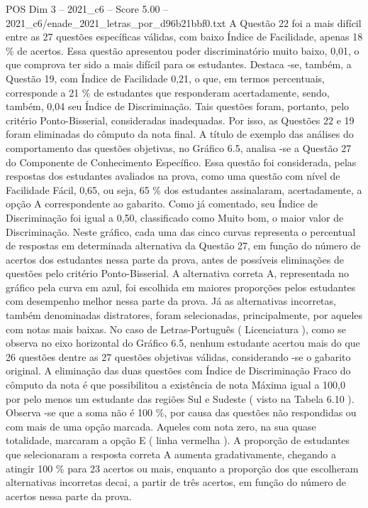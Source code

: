 \begin{textsample}{POS Dim 3 – 2021\_c6 – Score 5.00 – 2021\_c6/enade\_2021\_letras\_por\_d96b21bbf0.txt}
A Questão 22 foi a mais difícil entre as 27 questões específicas válidas, com baixo Índice de Facilidade, apenas 18 \% de acertos.
Essa questão apresentou poder discriminatório muito baixo, 0,01, o que comprova ter sido a mais difícil para os estudantes.
Destaca -se, também, a Questão 19, com Índice de Facilidade 0,21, o que, em termos percentuais, corresponde a 21 \% de estudantes que responderam acertadamente, sendo, também, 0,04 seu Índice de Discriminação.
Tais questões foram, portanto, pelo critério Ponto-Bisserial, consideradas inadequadas.
Por isso, as Questões 22 e 19 foram eliminadas do cômputo da nota final.
A título de exemplo das análises do comportamento das questões objetivas, no Gráfico 6.5, analisa -se a Questão 27 do Componente de Conhecimento Específico.
Essa questão foi considerada, pelas respostas dos estudantes avaliados na prova, como uma questão com nível de Facilidade Fácil, 0,65, ou seja, 65 \% dos estudantes assinalaram, acertadamente, a opção A correspondente ao gabarito.
Como já comentado, seu Índice de Discriminação foi igual a 0,50, classificado como Muito bom, o maior valor de Discriminação.
Neste gráfico, cada uma das cinco curvas representa o percentual de respostas em determinada alternativa da Questão 27, em função do número de acertos dos estudantes nessa parte da prova, antes de possíveis eliminações de questões pelo critério Ponto-Bisserial.
A alternativa correta A, representada no gráfico pela curva em azul, foi escolhida em maiores proporções pelos estudantes com desempenho melhor nessa parte da prova.
Já as alternativas incorretas, também denominadas distratores, foram selecionadas, principalmente, por aqueles com notas mais baixas.
No caso de Letras-Português ( Licenciatura ), como se observa no eixo horizontal do Gráfico 6.5, nenhum estudante acertou mais do que 26 questões dentre as 27 questões objetivas válidas, considerando -se o gabarito original.
A eliminação das duas questões com Índice de Discriminação Fraco do cômputo da nota é que possibilitou a existência de nota Máxima igual a 100,0 por pelo menos um estudante das regiões Sul e Sudeste ( visto na Tabela 6.10 ).
Observa -se que a soma não é 100 \%, por causa das questões não respondidas ou com mais de uma opção marcada.
Aqueles com nota zero, na sua quase totalidade, marcaram a opção E ( linha vermelha ).
A proporção de estudantes que selecionaram a resposta correta A aumenta gradativamente, chegando a atingir 100 \% para 23 acertos ou mais, enquanto a proporção dos que escolheram alternativas incorretas decai, a partir de três acertos, em função do número de acertos nessa parte da prova.

\end{textsample}
